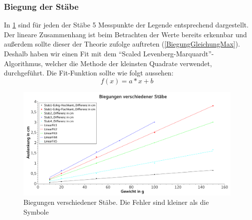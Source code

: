 \documentclass[
	a4paper,
	12pt,
	pagesize,
	ngerman
]{scrartcl}
\begin{document}
	\subsubsection{Biegung der Stäbe}
	In \cref{BiegungGraph} sind für jeden der Stäbe 5 Messpunkte der Legende entsprechend dargestellt. Der lineare Zusammenhang ist beim Betrachten der Werte bereits erkennbar und außerdem sollte dieser der Theorie zufolge auftreten (\cref{BiegungGleichungMax}). Deshalb haben wir einen Fit mit dem \enquote{Scaled Levenberg-Marquardt}-Algorithmus, welcher die Methode der kleinsten Quadrate verwendet, durchgeführt. Die Fit-Funktion sollte wie folgt aussehen:
	\begin{equation}
		f(x)=a*x+b
	\end{equation}
	\begin{figure}[tb]
		\includegraphics[width=1\textwidth]{Biegungen}
		\centering
		\caption{Biegungen verschiedener Stäbe. Die Fehler sind kleiner als die Symbole}
		\label{BiegungGraph}
		\centering
	\end{figure}
\end{document}
